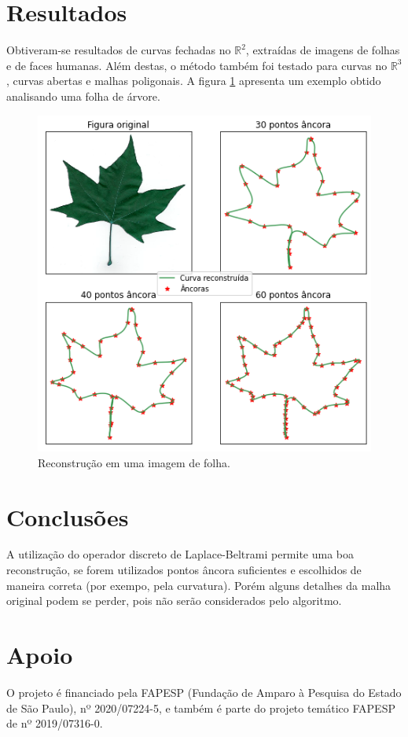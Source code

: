 \documentclass[a4paper,10pt,twocolumn]{article}
\begin{document}
	
	\section*{\hfil Resultados}
	
	Obtiveram-se resultados de curvas fechadas no $\mathbb{R}^2$, extraídas de imagens de folhas e de faces humanas. Além destas, o método também foi testado para curvas no $\mathbb{R}^3$, curvas abertas e malhas poligonais. A figura \ref{fig:leafs} apresenta um exemplo obtido analisando uma folha de árvore.

	\begin{figure}[ht!]
		\centering
		\includegraphics[width=0.85\linewidth]{imagens/leafs.png}
		\caption{Reconstrução em uma imagem de folha.}
		\label{fig:leafs}
	\end{figure}
	
	
	\section*{\hfil Conclusões}
	A utilização do operador discreto de Laplace-Beltrami permite uma boa reconstrução, se forem utilizados pontos âncora suficientes e escolhidos de maneira correta (por exempo, pela curvatura). Porém alguns detalhes da malha original podem se perder, pois não serão considerados pelo algoritmo.
	
	
	\renewcommand\refname{\hfil Referências Bibliográficas \hfil}
%
	\begin{center}
	\begin{thebibliography}{LLL}	
	\end{thebibliography}
	\end{center}
	
	\section*{\hfil Apoio}
	O projeto é financiado pela FAPESP (Fundação de Amparo à Pesquisa do Estado de São Paulo), nº 2020/07224-5, e também é parte do projeto temático FAPESP de nº 2019/07316-0.
	
	
\end{document}
